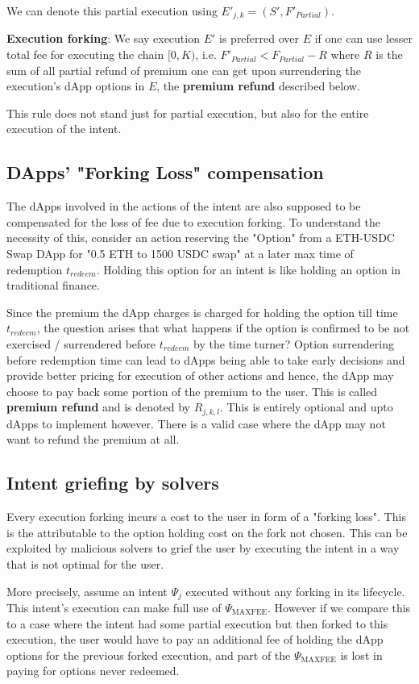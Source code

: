 We can denote this partial execution using $E'_{j, k} = (S', F'_{Partial})$.

\textbf{Execution forking}: We say execution $E'$ is preferred over $E$ if one can use lesser total fee for executing the chain $[0, K)$, i.e. $F'_{Partial} < F_{Partial} - R$ where $R$ is the sum of all partial refund of premium one can get upon surrendering the execution's dApp options in $E$, the \textbf{premium refund} described below.

This rule does not stand just for partial execution, but also for the entire execution of the intent.

\subsection{DApps' "Forking Loss" compensation}
The dApps involved in the actions of the intent are also supposed to be compensated for the loss of fee due to execution forking. To understand the necessity of this, consider an action reserving the "Option" from a ETH-USDC Swap DApp for "0.5 ETH to 1500 USDC swap" at a later max time of redemption $t_{redeem}$. Holding this option for an intent is like holding an option in traditional finance.

Since the premium the dApp charges is charged for holding the option till time $t_{redeem}$, the question arises that what happens if the option is confirmed to be not exercised / surrendered before $t_{redeem}$ by the time turner? Option surrendering before redemption time can lead to dApps being able to take early decisions and provide better pricing for execution of other actions and hence, the dApp may choose to pay back some portion of the premium to the user. This is called \textbf{premium refund} and is denoted by $R_{j, k, l}$. This is entirely optional and upto dApps to implement however. There is a valid case where the dApp may not want to refund the premium at all.

\subsection{Intent griefing by solvers}

Every execution forking incurs a cost to the user in form of a "forking loss". This is the attributable to the option holding cost on the fork not chosen. This can be exploited by malicious solvers to grief the user by executing the intent in a way that is not optimal for the user.

More precisely, assume an intent $\Psi_j$ executed without any forking in its lifecycle. This intent's execution can make full use of $\Psi_\text{MAXFEE}$. However if we compare this to a case where the intent had some partial execution but then forked to this execution, the user would have to pay an additional fee of holding the dApp options for the previous forked execution, and part of the $\Psi_\text{MAXFEE}$ is lost in paying for options never redeemed.

